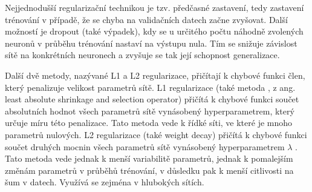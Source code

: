 Nejjednodušší regularizační technikou je tzv. předčasné zastavení, tedy
zastavení trénování v případě, že se chyba na validačních datech začne
zvyšovat. Další možností je dropout (také výpadek), kdy se u určitého počtu
náhodně zvolených neuronů v průběhu trénování nastaví na výstupu nula. Tím se
snižuje závislost sítě na konkrétních neuronech a zvyšuje se tak její schopnost
generalizace.

Další dvě metody, nazývané L1 a L2 regularizace, přičítají k chybové funkci
člen, který penalizuje velikost parametrů sítě. L1 regularizace (také metoda
\cite{lasso}, z ang. least absolute shrinkage and selection operator) přičítá k
chybové funkci součet absolutních hodnot všech parametrů sítě vynásobený
hyperparametrem, který určuje míru této penalizace. Tato metoda vede k řídké
síti, ve které je mnoho parametrů nulových. L2 regularizace (také weight decay)
přičítá k chybové funkci součet druhých mocnin všech parametrů sítě vynásobený
hyperparametrem $\lambda$ \cite{l2}. Tato metoda vede jednak k menší
variabilitě parametrů, jednak k pomalejším změnám parametrů v průběhů
trénování, v důsledku pak k menší citlivosti na šum v datech. Využívá se
zejména v hlubokých sítích.

\endinput
